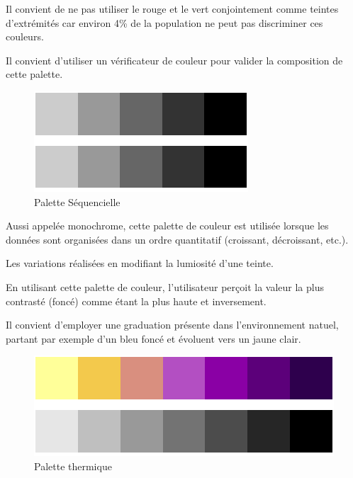 \documentclass[a4paper,12pt]{article}
\begin{document}
\begin{multicols}{2}
Il convient de ne pas utiliser le rouge et le vert conjointement comme teintes d'extrémités car environ 4\% de la population ne peut pas discriminer ces couleurs. \autocite{schwabishCenteringAccessibilityData2022a}

Il convient d'utiliser un vérificateur de couleur pour valider la composition de cette palette.\autocite{andreaskrauseBestPracticesData2024}

\begin{figure}[H]
\centering
\includegraphics[width=.9\linewidth]{./img/palette-monochrome.pdf}
\caption{\label{fig:Pal-m}Palette Séquencielle}
\end{figure}

Aussi appelée \og monochrome\fg{}, cette palette de couleur est utilisée lorsque les données sont organisées dans un ordre quantitatif (croissant, décroissant, etc.). \autocite{wilkeColorScales2019,jonathanschwabishDevelopingDataVisualization2021}

Les variations réalisées en modifiant la lumiosité d'une teinte.\autocite{andreaskrauseBestPracticesData2024} 

En utilisant cette palette de couleur, l'utilisateur perçoit la valeur la plus contrasté (foncé) comme étant la plus haute et inversement. \autocite{REF???}

Il convient d'employer une graduation présente dans l'environnement natuel, partant par exemple d'un bleu foncé et évoluent vers un jaune clair. \autocite{wilkeColorScales2019}

\begin{figure}[H]
\centering
\includegraphics[width=.9\linewidth]{./img/palette-thermique.pdf}
\caption{\label{fig:Pal-t}Palette thermique}
\end{figure}


\end{multicols}
\end{document}
